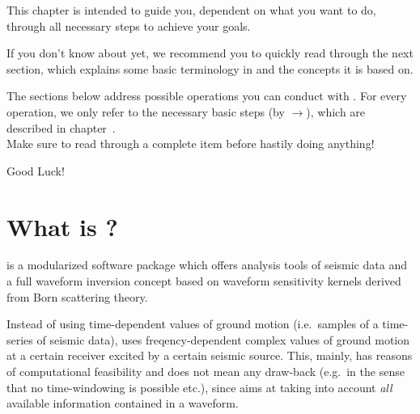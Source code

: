 %
%
%
This chapter is intended to guide you, dependent on what you want to do, through all necessary steps
to achieve your goals.

If you don't know about \ASKI yet, we recommend you to quickly read through the next section, which 
explains some basic terminology in \ASKI and the concepts it is based on.

The sections below address possible operations you can conduct with \ASKI. For every operation, we only refer 
to the necessary basic steps (by $\rightarrow$), which are described in chapter~.\\
Make sure to read through a complete item before hastily doing anything!

Good Luck!
%
%
\section*{What is \ASKI?} \label{guide,sec:ASKI}
%
%
\ASKI is a modularized software package which offers analysis tools of seismic data and a full waveform
inversion concept based on waveform sensitivity kernels derived from Born scattering theory. 

Instead of using time-dependent values of ground motion (i.e.\ samples of a time-series of seismic data), 
\ASKI uses freqency-dependent complex values of ground motion at a certain receiver excited by a certain 
seismic source. This, mainly, has reasons of computational feasibility and does not mean any draw-back 
(e.g.\ in the sense that no time-windowing is possible etc.), since \ASKI aims at taking into account
\emph{all} available information contained in a waveform.

